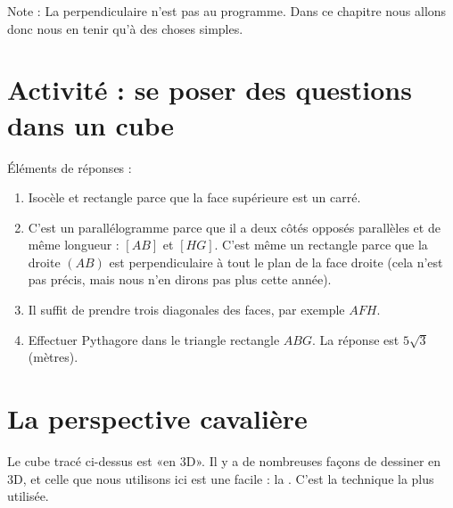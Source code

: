 

Note : La perpendiculaire n'est pas au programme. Dans ce chapitre nous allons donc nous en tenir qu'à des choses simples.

\setcounter{section}{-1}

\section{Activité : se poser des questions dans un cube}



Éléments de réponses :
\begin{enumerate}
    \item
        Isocèle et rectangle parce que la face supérieure est un carré.
    \item
        C'est un parallélogramme parce que il a deux côtés opposés parallèles et de même longueur : \( [AB]\) et \( [HG]\). C'est même un rectangle parce que la droite \( (AB)\) est perpendiculaire à tout le plan de la face droite (cela n'est pas précis, mais nous n'en dirons pas plus cette année).
    \item
        Il suffit de prendre trois diagonales des faces, par exemple \( AFH\).
    \item
        Effectuer Pythagore dans le triangle rectangle \( ABG\). La réponse est \( 5\sqrt{3}\) (mètres).
\end{enumerate}

\section{La perspective cavalière}

Le cube tracé ci-dessus est «en 3D». Il y a de nombreuses façons de dessiner en 3D, et celle que nous utilisons ici est une facile : la . C'est la technique la plus utilisée.

